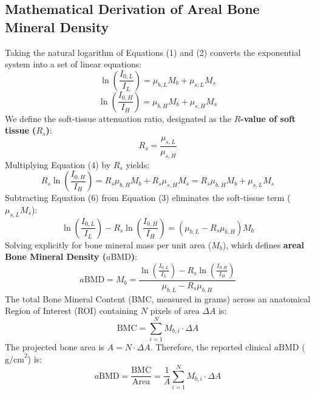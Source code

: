 \documentclass[11pt,a4paper]{article}
\begin{document}
\subsection{Mathematical Derivation of Areal Bone Mineral Density}

Taking the natural logarithm of Equations (1) and (2) converts the exponential system into a set of linear equations:
\begin{equation}
    \ln\left( \frac{I_{0,L}}{I_L} \right) = \mu_{b,L} M_b + \mu_{s,L} M_s
\end{equation}
\begin{equation}
    \ln\left( \frac{I_{0,H}}{I_H} \right) = \mu_{b,H} M_b + \mu_{s,H} M_s
\end{equation}
We define the soft-tissue attenuation ratio, designated as the \textbf{$R$-value of soft tissue ($R_s$)}:
\begin{equation}
    R_s = \frac{\mu_{s,L}}{\mu_{s,H}}
\end{equation}
Multiplying Equation (4) by $R_s$ yields:
\begin{equation}
    R_s \ln\left( \frac{I_{0,H}}{I_H} \right) = R_s \mu_{b,H} M_b + R_s \mu_{s,H} M_s = R_s \mu_{b,H} M_b + \mu_{s,L} M_s
\end{equation}
Subtracting Equation (6) from Equation (3) eliminates the soft-tissue term ($\mu_{s,L} M_s$):
\begin{equation}
    \ln\left( \frac{I_{0,L}}{I_L} \right) - R_s \ln\left( \frac{I_{0,H}}{I_H} \right) = \left( \mu_{b,L} - R_s \mu_{b,H} \right) M_b
\end{equation}
Solving explicitly for bone mineral mass per unit area ($M_b$), which defines \textbf{areal Bone Mineral Density ($a\text{BMD}$)}:
\begin{equation}
    a\text{BMD} = M_b = \frac{\ln\left( \frac{I_{0,L}}{I_L} \right) - R_s \ln\left( \frac{I_{0,H}}{I_H} \right)}{\mu_{b,L} - R_s \mu_{b,H}}
\end{equation}
The total Bone Mineral Content (BMC, measured in grams) across an anatomical Region of Interest (ROI) containing $N$ pixels of area $\Delta A$ is:
\begin{equation}
    \text{BMC} = \sum_{i=1}^{N} M_{b,i} \cdot \Delta A
\end{equation}
The projected bone area is $A = N \cdot \Delta A$. Therefore, the reported clinical $a\text{BMD}$ ($\text{g/cm}^2$) is:
\begin{equation}
    a\text{BMD} = \frac{\text{BMC}}{\text{Area}} = \frac{1}{A} \sum_{i=1}^{N} M_{b,i} \cdot \Delta A
\end{equation}
\end{document}

